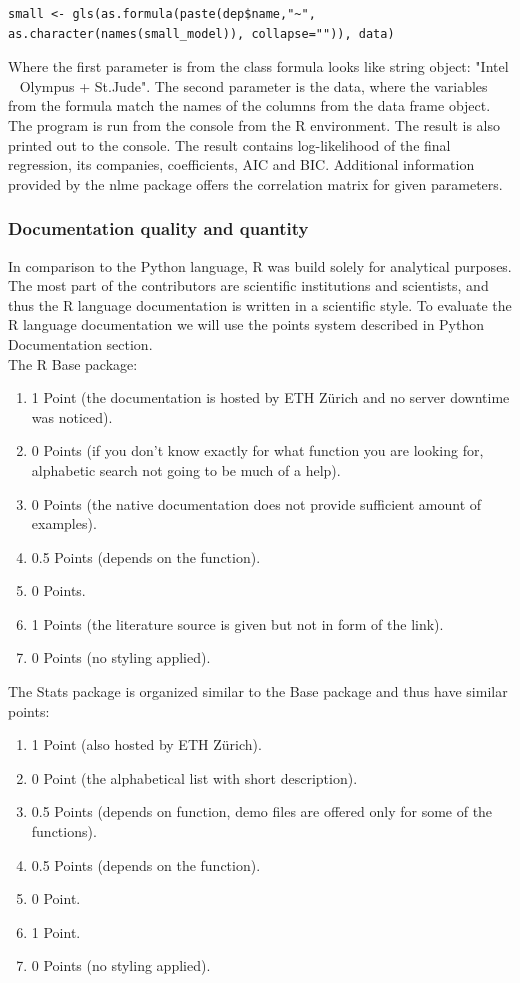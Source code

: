\documentclass{article}
\begin{document}
\begin{verbatim}
small <- gls(as.formula(paste(dep$name,"~", as.character(names(small_model)), collapse="")), data)
\end{verbatim} 
Where the first parameter is from the class formula looks like string object: "Intel ~ Olympus + St.Jude". The second parameter is the data, where the variables from the formula match the names of the columns from the data frame object.\\
The program is run from the console from the R environment. The result is also printed out to the console. The result contains log-likelihood of the final regression, its companies, coefficients, AIC and BIC. Additional information provided by the nlme package offers the correlation matrix for given parameters.  
\subsubsection{Documentation quality and quantity}
In comparison to the Python language, R was build solely for analytical purposes. The most part of the contributors are scientific institutions and scientists, and thus the R language documentation is written in a scientific style. To evaluate the R language documentation we will use the points system described in Python Documentation section.\\
The R Base package:
\begin{enumerate}
    \item 1 Point (the documentation is hosted by ETH Zürich and no server downtime was noticed).
    \item 0 Points (if you don't know exactly for what function you are looking for, alphabetic search not going to be much of a help).
    \item 0 Points (the native documentation does not provide sufficient amount of examples).
    \item 0.5 Points (depends on the function).
    \item 0 Points.
    \item 1 Points (the literature source is given but not in form of the link).
    \item 0 Points (no styling applied).
\end{enumerate}
The Stats package is organized similar to the Base package and thus have similar points:
\begin{enumerate}
    \item 1 Point (also hosted by ETH Zürich).
    \item 0 Point (the alphabetical list with short description).
    \item 0.5 Points (depends on function, demo files are offered only for some of the functions).
    \item 0.5 Points (depends on the function).
    \item 0 Point.
    \item 1 Point.
    \item 0 Points (no styling applied).
\end{enumerate} 
\end{document}
